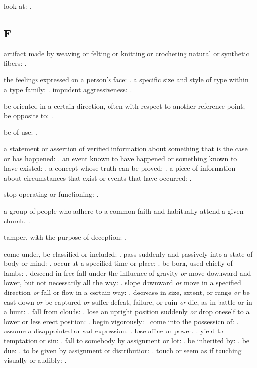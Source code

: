   look at: .

\subsection*{F}

  artifact made by weaving or felting or knitting or crocheting natural or synthetic fibers: .

  the feelings expressed on a person's face: . a specific size and style of type within a type family: . impudent aggressiveness: .

  be oriented in a certain direction, often with respect to another reference point; be opposite to: .

  be of use: .

  a statement or assertion of verified information about something that is the case or has happened: . an event known to have happened or something known to have existed: . a concept whose truth can be proved: . a piece of information about circumstances that exist or events that have occurred: .

  stop operating or functioning: .

  a group of people who adhere to a common faith and habitually attend a given church: .

  tamper, with the purpose of deception: .

  come under, be classified or included: . pass suddenly and passively into a state of body or mind: . occur at a specified time or place: . be born, used chiefly of lambs: . descend in free fall under the influence of gravity \textit{or} move downward and lower, but not necessarily all the way: . slope downward \textit{or} move in a specified direction \textit{or} fall or flow in a certain way: . decrease in size, extent, or range \textit{or} be cast down \textit{or} be captured \textit{or} suffer defeat, failure, or ruin \textit{or} die, as in battle or in a hunt: . fall from clouds: . lose an upright position suddenly \textit{or} drop oneself to a lower or less erect position: . begin vigorously: . come into the possession of: . assume a disappointed or sad expression: . lose office or power: . yield to temptation or sin: . fall to somebody by assignment or lot: . be inherited by: . be due: . to be given by assignment or distribution: . touch or seem as if touching visually or audibly: .


